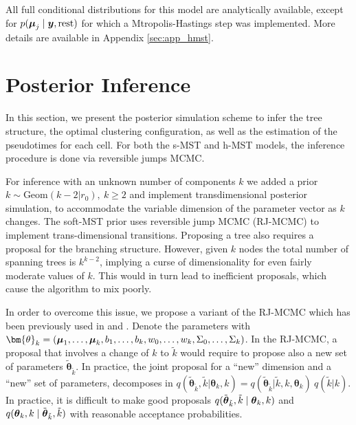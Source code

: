 All full conditional distributions for this model are analytically available, except for $p(\mbox{\boldmath $\mu$}_j\mid \mbox{\boldmath $y$}, \mbox{rest})$ for which a Mtropolis-Hastings step was implemented. More details are available in Appendix \ref{sec:app_hmst}.



\section{Posterior Inference}
\label{sec:mst_inference}

In this section, we present the posterior simulation scheme to infer the tree structure, the optimal clustering configuration, as well as the estimation of the pseudotimes for each cell. For both the s-MST and h-MST models, the inference procedure is done via reversible jumps MCMC. 


For inference with an unknown number of components $k$ we 
added a prior $k \sim \mbox{Geom}(k - 2 | r_0), \ k \geq 2$ and implement transdimensional  posterior simulation, to accommodate the variable dimension of the parameter vector as $k$ changes. The soft-MST prior uses reversible jump MCMC (RJ-MCMC) \citep{green1995}  to implement trans-dimensional transitions.  Proposing a tree also requires a proposal for the branching structure. However, given $k$ nodes the total number of spanning trees is $k^{k-2}$, implying a curse of dimensionality for even fairly moderate values of $k$.  This would in turn lead to inefficient proposals, which cause the algorithm to mix poorly.

In order to overcome this issue, we propose a variant of the RJ-MCMC
which has been previously used in \cite{xu2016bayesian} and
\cite{lee2015bayesian}.  Denote the parameters with
$\bm{\theta}_k = (\bfmu_1, \dots, \bfmu_k, b_1, \dots, b_k, w_0,
\dots, w_k, \Sigma_0, \dots, \Sigma_k)$.  In the RJ-MCMC, a proposal that involves a
change of $k$ to $\tilde{k}$ would require to propose also a new set
of parameters $\tilde{\bm{\theta}}_{\tilde{k}}$.  In practice, the
joint proposal for a ``new'' dimension and a ``new'' set of
parameters, decomposes in $q(\tilde{\bm{\theta}}_{\tilde{k}},
\tilde{k} | \bm{\theta}_{k}, k) = q(\tilde{\bm{\theta}}_{\tilde{k}} |
\tilde{k}, k, \bm{\theta}_{k})\ q(\tilde{k} | k)$. In practice, it is difficult to make good proposals $q(\tilde{\mbox{\boldmath $\theta$}}_{\tilde{k}}, \tilde{k} \mid \mbox{\boldmath $\theta$}_k, k)$ and $q(\mbox{\boldmath $\theta$}_k, k \mid \tilde{\mbox{\boldmath $\theta$}}_{\tilde{k}}, \tilde{k} )$ with reasonable acceptance probabilities. 

